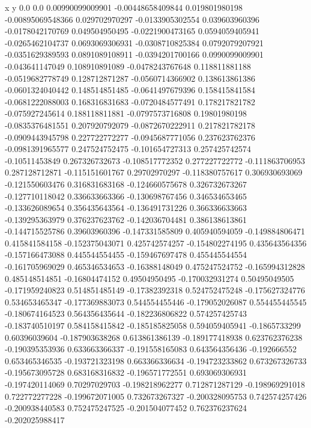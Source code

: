               x                y
            0.0              0.0
0.00990099009901  -0.00448658409844
 0.019801980198  -0.00895069548366
 0.029702970297  -0.0133905302554
 0.039603960396  -0.0178042170769
 0.049504950495  -0.0221900473165
0.0594059405941  -0.0265462104737
0.0693069306931  -0.0308710825384
0.0792079207921  -0.0351629389593
0.0891089108911  -0.0394201700166
0.0990099009901  -0.043641147049
 0.108910891089  -0.0478243767648
 0.118811881188  -0.0519682778749
 0.128712871287  -0.0560714366902
 0.138613861386  -0.0601324040442
 0.148514851485  -0.0641497679396
 0.158415841584  -0.0681222088003
 0.168316831683  -0.0720484577491
 0.178217821782  -0.075927245614
 0.188118811881  -0.0797573716808
  0.19801980198  -0.0835376481551
 0.207920792079  -0.0872670222911
 0.217821782178  -0.0909443945798
 0.227722772277  -0.0945687771056
 0.237623762376  -0.0981391965577
 0.247524752475  -0.101654727313
 0.257425742574   -0.10511453849
 0.267326732673  -0.108517772352
 0.277227722772  -0.111863706953
 0.287128712871  -0.115151601767
  0.29702970297  -0.118380757617
 0.306930693069  -0.121550603476
 0.316831683168  -0.124660575678
 0.326732673267  -0.127710118042
 0.336633663366  -0.130698767456
 0.346534653465  -0.133626089654
 0.356435643564  -0.136491731226
 0.366336633663  -0.139295363979
 0.376237623762  -0.142036704481
 0.386138613861  -0.144715525786
  0.39603960396  -0.147331585809
 0.405940594059  -0.149884806471
 0.415841584158  -0.152375043071
 0.425742574257  -0.154802274195
 0.435643564356  -0.157166473088
 0.445544554455  -0.159467697478
 0.455445544554  -0.161705969029
 0.465346534653   -0.16388148049
 0.475247524752  -0.165994312828
 0.485148514851   -0.16804474152
  0.49504950495  -0.170032931274
  0.50495049505  -0.171959240823
 0.514851485149   -0.17382392318
 0.524752475248  -0.175627324776
 0.534653465347  -0.177369883073
 0.544554455446  -0.179052026087
 0.554455445545  -0.180674164523
 0.564356435644  -0.182236806822
 0.574257425743  -0.183740510197
 0.584158415842  -0.185185825058
 0.594059405941    -0.1865733299
  0.60396039604  -0.187903638268
 0.613861386139  -0.189177418938
 0.623762376238  -0.190395353936
 0.633663366337  -0.191558165083
 0.643564356436     -0.192666552
 0.653465346535  -0.193721323198
 0.663366336634  -0.194723233862
 0.673267326733  -0.195673095728
 0.683168316832  -0.196571772551
 0.693069306931  -0.197420114069
  0.70297029703  -0.198218962277
 0.712871287129  -0.198969291018
 0.722772277228  -0.199672071005
 0.732673267327  -0.200328095753
 0.742574257426  -0.200938440583
 0.752475247525  -0.201504077452
 0.762376237624  -0.202025988417
